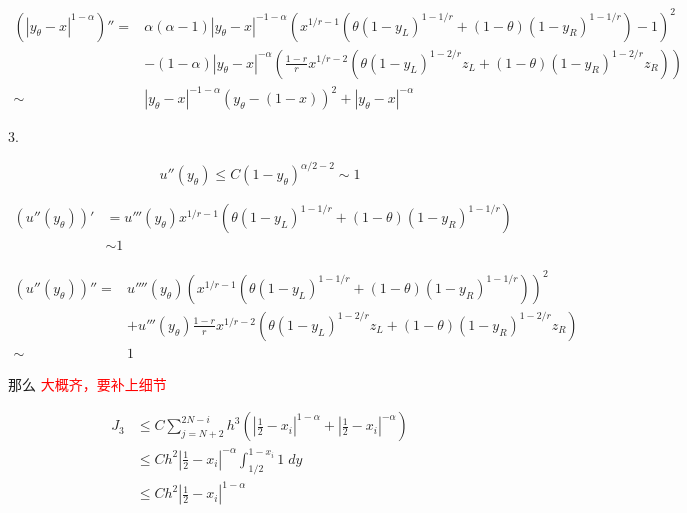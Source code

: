 \documentclass{ctexart}
\begin{document}
\begin{equation}
    \begin{aligned}
        (|y_\theta-x|^{1-\alpha})''
        =    & \alpha(\alpha-1)|y_\theta-x|^{-1-\alpha} (x^{1/r-1}(\theta (1-y_L)^{1-1/r} + (1-\theta)(1-y_R)^{1-1/r}) - 1)^2                                     \\
             & - (1-\alpha)|y_\theta-x|^{-\alpha}(\frac{1-r}{r} x^{1/r-2} (\theta (1-y_L)^{1-2/r} z_L + (1-\theta) (1-y_R)^{1-2/r} z_R)) \\
        \sim & |y_\theta-x|^{-1-\alpha} (y_\theta - (1-x))^2 + |y_\theta-x|^{-\alpha} 
    \end{aligned}
\end{equation}


3.

\begin{equation}
    u''(y_\theta) \le C (1-y_\theta)^{\alpha/2-2} \sim 1
\end{equation}


\begin{equation}
    \begin{aligned}
        (u''(y_\theta))' & = u'''(y_\theta) x^{1/r-1}(\theta (1-y_L)^{1-1/r} + (1-\theta) (1-y_R)^{1-1/r}) \\
                         & \sim 1
    \end{aligned}
\end{equation}

\begin{equation}
    \begin{aligned}
        (u''(y_\theta))'' = 
            & u''''(y_\theta) (x^{1/r-1}(\theta (1-y_L)^{1-1/r} + (1-\theta) (1-y_R)^{1-1/r}))^2                  \\
                & + u'''(y_\theta)\frac{1-r}{r} x^{1/r-2}(\theta (1-y_L)^{1-2/r}z_L + (1-\theta) (1-y_R)^{1-2/r}z_R)  \\
            \sim & 1
    \end{aligned}
\end{equation}

那么 \textcolor{red}{大概齐，要补上细节}

\begin{equation}
    \begin{aligned}
        J_3 &\le C \sum_{j=N+2}^{2N-i} h^3 ( |\frac{1}{2}-x_i|^{1-\alpha} +  |\frac{1}{2}-x_i|^{-\alpha} ) \\
            &\le C h^2 |\frac{1}{2}-x_i|^{-\alpha} \int_{1/2}^{1-x_i} 1 \; dy   \\
            & \le C h^2 |\frac{1}{2}-x_i|^{1-\alpha}
    \end{aligned}
\end{equation}
\end{document}
